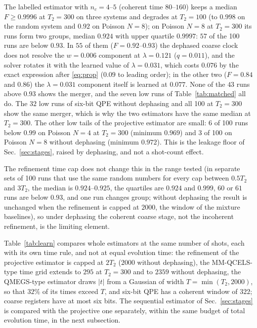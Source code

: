 \documentclass[journal]{IEEEtran}
\begin{document}
The labelled estimator with $n_c=4$--$5$ (coherent time $80$--$160$) keeps a median $F\ge0.9996$ at $T_2=300$ on three systems and degrades at $T_2=100$ (to $0.998$ on the random system and $0.92$ on Poisson $N=8$); on Poisson $N=8$ at $T_2=300$ its runs form two groups, median $0.924$ with upper quartile $0.9997$: $57$ of the 100 runs are below $0.93$. In $55$ of them ($F=0.92$--$0.93$) the dephased coarse clock does not resolve the $w=0.006$ component at $\lambda=0.121$ ($q=0.011$), and the solver rotates it with the learned value of $\lambda=0.031$, which costs $0.076$ by the exact expression after \eqref{eq:prop} ($0.09$ to leading order); in the other two ($F=0.84$ and $0.86$) the $\lambda=0.031$ component itself is learned at $0.077$. None of the $43$ runs above $0.93$ shows the merger, and the seven low runs of Table~\ref{tab:matched} all do. The $32$ low runs of six-bit QPE without dephasing and all 100 at $T_2=300$ show the same merger, which is why the two estimators have the same median at $T_2=300$. The other low tails of the projective estimator are small: $6$ of 100 runs below $0.99$ on Poisson $N=4$ at $T_2=300$ (minimum $0.969$) and $3$ of 100 on Poisson $N=8$ without dephasing (minimum $0.972$). This is the leakage floor of Sec.~\ref{sec:stages}, raised by dephasing, and not a shot-count effect.

The refinement time cap does not change this in the range tested (in separate sets of 100 runs that use the same random numbers for every cap between $0.5T_2$ and $3T_2$, the median is $0.924$--$0.925$, the quartiles are $0.924$ and $0.999$, $60$ or $61$ runs are below $0.93$, and one run changes group; without dephasing the result is unchanged when the refinement is capped at $2000$, the window of the mixture baselines), so under dephasing the coherent coarse stage, not the incoherent refinement, is the limiting element.

Table~\ref{tab:learn} compares whole estimators at the same number of shots, each with its own time rule, and not at equal evolution time: the refinement of the projective estimator is capped at $2T_2$ ($2000$ without dephasing), the MM-QCELS-type time grid extends to $295$ at $T_2=300$ and to $2359$ without dephasing, the QMEGS-type estimator draws $|t|$ from a Gaussian of width $T=\min(T_2,2000)$, so that $32\%$ of its times exceed $T$, and six-bit QPE has a coherent window of $322$; coarse registers have at most six bits. The sequential estimator of Sec.~\ref{sec:stages} is compared with the projective one separately, within the same budget of total evolution time, in the next subsection.
\end{document}
